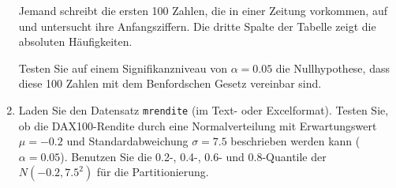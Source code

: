 \begin{enumerate}
Jemand schreibt die ersten 100 Zahlen, die in einer Zeitung vorkommen, auf
und untersucht ihre Anfangsziffern. Die dritte Spalte der Tabelle zeigt die
absoluten H\"{a}ufigkeiten.

Testen Sie auf einem Signifikanzniveau von $\alpha =0.05$ die Nullhypothese,
dass diese 100 Zahlen mit dem Benfordschen Gesetz vereinbar sind.

\item Laden Sie den Datensatz \texttt{mrendite} (im Text- oder Excelformat).
Testen Sie, ob die DAX100-Rendite durch eine Normalverteilung mit
Erwartungswert $\mu =-0.2$ und Standardabweichung $\sigma =7.5$ beschrieben
werden kann ($\alpha =0.05$). Benutzen Sie die 0.2-, 0.4-, 0.6- und
0.8-Quantile der $N\left( -0.2,7.5^{2}\right) $ f\"{u}r die Partitionierung.
\end{enumerate}


